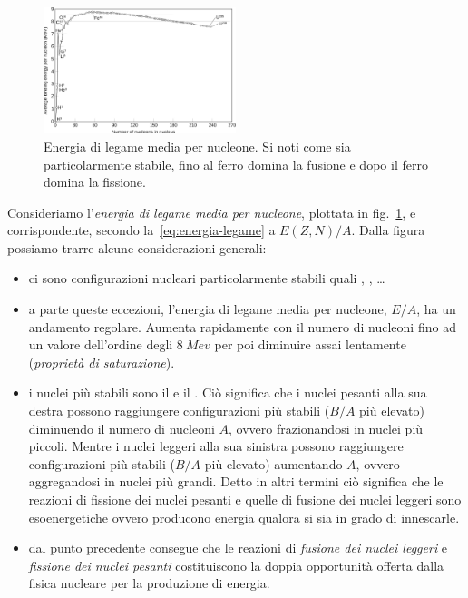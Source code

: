 \begin{figure}
    \centering
    \includegraphics[width=0.5\textwidth]{immagini/energia-legame.png}
    \caption{Energia di legame media per nucleone. Si noti come  sia particolarmente stabile, fino al ferro domina la fusione e dopo il ferro domina la fissione.}
    \label{fig:energia-legame}
\end{figure}

Consideriamo l'\emph{energia di legame media per nucleone}, plottata in fig.~\ref{fig:energia-legame}, e corrispondente, secondo la~\eqref{eq:energia-legame} a $E(Z,N) / A$. Dalla figura possiamo trarre alcune considerazioni generali:
\begin{itemize}
    \item ci sono configurazioni nucleari particolarmente stabili quali , ,  \dots
    \item a parte queste eccezioni, l’energia di legame media per nucleone, $E/A$, ha un andamento regolare. Aumenta rapidamente con il numero di nucleoni fino ad un valore dell’ordine degli $\SI{8}{Mev}$ per poi diminuire assai lentamente (\emph{proprietà di saturazione}).
    \item i nuclei più stabili sono il  e il . Ciò significa che i nuclei pesanti alla sua destra possono raggiungere configurazioni più stabili ($B/A$ più elevato) diminuendo il numero di nucleoni $A$, ovvero frazionandosi in nuclei più piccoli. Mentre i nuclei leggeri alla sua sinistra possono raggiungere configurazioni più stabili ($B/A$ più elevato) aumentando $A$, ovvero aggregandosi in nuclei più grandi. Detto in altri termini ciò significa che le reazioni di fissione dei nuclei pesanti e quelle di fusione dei nuclei leggeri sono esoenergetiche ovvero producono energia qualora si sia in grado di innescarle.
    \item dal punto precedente consegue che le reazioni di \emph{fusione dei nuclei leggeri} e \emph{fissione dei nuclei pesanti} costituiscono la doppia opportunità offerta dalla fisica nucleare per la produzione di energia.
\end{itemize}

